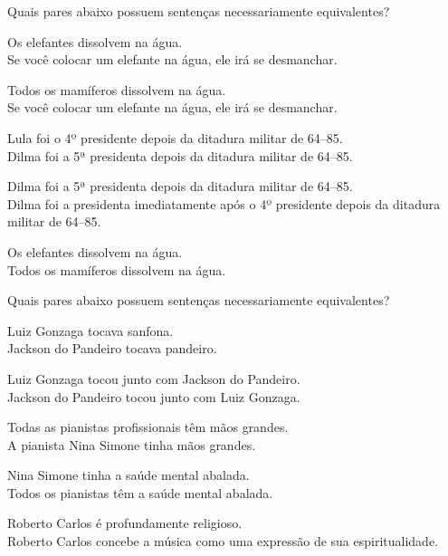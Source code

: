 \problempart Quais pares abaixo possuem sentenças necessariamente equivalentes?

\begin{earg}
\item Os elefantes dissolvem na água.	\\
	Se você colocar um elefante na água, ele irá se desmanchar.
\item Todos os mamíferos dissolvem na água. \\		
	Se você colocar um elefante na água, ele irá se desmanchar. 
\item Lula foi o 4º presidente depois da ditadura militar de 64--85. \\
	 Dilma foi a 5ª presidenta depois da ditadura militar de 64--85. 
\item Dilma foi a 5ª presidenta depois da ditadura militar de 64--85. \\
	  Dilma foi a presidenta imediatamente após o 4º presidente depois da ditadura militar de 64--85.
\item Os elefantes dissolvem na água. 	\\	
	Todos os mamíferos dissolvem na água. 
\end{earg}

\problempart Quais pares abaixo possuem sentenças necessariamente equivalentes?

\begin{earg}
\item Luiz Gonzaga tocava sanfona. \\
	Jackson do Pandeiro tocava pandeiro.

\item Luiz Gonzaga tocou junto com Jackson do Pandeiro. \\
	Jackson do Pandeiro tocou junto com Luiz Gonzaga.

\item Todas  as pianistas profissionais têm mãos grandes. \\
	A pianista Nina Simone tinha mãos grandes.

\item Nina Simone tinha a saúde mental abalada. \\
	Todos os pianistas têm a saúde mental abalada.

\item Roberto Carlos é profundamente religioso. \\
	Roberto Carlos concebe a música como uma expressão de sua espiritualidade.
\end{earg}


